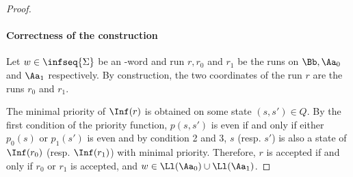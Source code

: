 \begin{proof}
    \paragraph*{Correctness of the construction}
    Let $w \in \infseq{\Sigma}$ be an \w-word and run $r, r_0$ and $r_1$
    be the runs on $\Bb, \Aa_0$ and $\Aa_1$ respectively.
    By construction, the two coordinates of the run $r$ are the runs $r_0$ and $r_1$.

    The minimal priority of $\Inf(r)$ is obtained
    on some state $(s, s') \in Q$. By the first condition
    of the priority function, $p(s, s')$ is even if and only if
    either $p_0(s)$ or $p_1(s')$ is even
    and by condition 2 and 3, $s$ (resp. $s'$) is also
    a state of $\Inf(r_0)$ (resp. $\Inf(r_1)$) with minimal priority.
    Therefore, $r$ is accepted if and only if $r_0$ or $r_1$ is accepted,
    and $w \in \Ll(\Aa_0) \cup \Ll(\Aa_1)$.

\end{proof}

